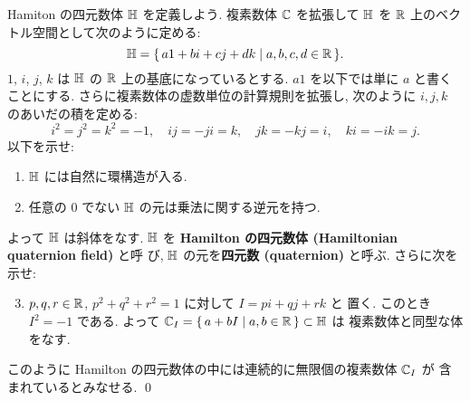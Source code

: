 \documentclass[12pt,twoside]{jarticle}
\begin{document}
\begin{question}
 \label{q:quarternion-1}
 Hamiton の四元数体 ${\mathbb H}$ を定義しよう.
 複素数体 ${\mathbb C}$ を拡張して %
 ${\mathbb H}$ を ${\mathbb R}$ 上のベクトル空間として次のように定める:
 \begin{equation*}
  {\mathbb H} = \{\, a1 + bi + cj + dk \mid a,b,c,d\in{\mathbb R} \,\}.
 \end{equation*}
 $1$, $i$, $j$, $k$ は ${\mathbb H}$ の ${\mathbb R}$ 上の基底になっているとする.
 $a1$ を以下では単に $a$ と書くことにする.
 さらに複素数体の虚数単位の計算規則を拡張し, 
 次のように $i,j,k$ のあいだの積を定める:
 \begin{equation*}
  i^2=j^2=k^2=-1, \quad ij=-ji=k, \quad jk=-kj=i, \quad ki=-ik=j.
 \end{equation*}
 以下を示せ:
 \begin{enumerate}
  \item ${\mathbb H}$ には自然に環構造が入る.
  \item 任意の $0$ でない ${\mathbb H}$ の元は乗法に関する逆元を持つ.
 \end{enumerate}
 よって ${\mathbb H}$ は斜体をなす.
 ${\mathbb H}$ を {\bf Hamilton の四元数体 (Hamiltonian quaternion field)} と呼
 び, ${\mathbb H}$ の元を{\bf 四元数 (quaternion)} と呼ぶ.
 さらに次を示せ:
 \begin{enumerate}
  \setcounter{enumi}{2}
  \item $p,q,r\in{\mathbb R}$, $p^2+q^2+r^2=1$ に対して $I=pi+qj+rk$ と
   置く. このとき $I^2=-1$ である. 
  よって ${\mathbb C}_I=\{\,a+bI\mid a,b\in{\mathbb R}\,\}\subset{\mathbb H}$ は
  複素数体と同型な体をなす.
 \end{enumerate}
 このように Hamilton の四元数体の中には連続的に無限個の複素数体 ${\mathbb C}_I$ が
 含まれているとみなせる.
 \qed
\end{question}
\end{document}
